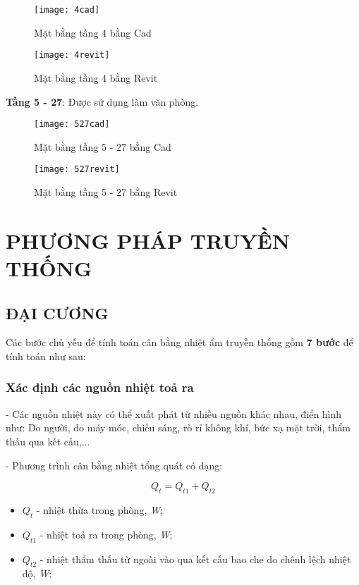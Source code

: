 \begin{figure}[H]
  \centering
  \texttt{[image: 4cad]}
  \caption{Mặt bằng tầng 4 bằng Cad}
\end{figure} 

\begin{figure}[H]
  \centering
  \texttt{[image: 4revit]}
  \caption{Mặt bằng tầng 4 bằng Revit}
\end{figure} 

\newpage
\textbf{Tầng 5 - 27}: Được sử dụng làm văn phòng.

\begin{figure}[H]
  \centering
  \texttt{[image: 527cad]}
  \caption{Mặt bằng tầng 5 - 27 bằng Cad}
\end{figure} 

\begin{figure}[H]
  \centering
  \texttt{[image: 527revit]}
  \caption{Mặt bằng tầng 5 - 27 bằng Revit}
\end{figure} 

\section{PHƯƠNG PHÁP TRUYỀN THỐNG}
\subsection{ĐẠI CƯƠNG}
Các bước chủ yếu để tính toán cân bằng nhiệt ẩm truyền thống gồm \textbf{7 bước} để tính toán như sau:
\subsubsection{Xác định các nguồn nhiệt toả ra}
- Các nguồn nhiệt này có thể xuất phát từ nhiều nguồn khác nhau, điển hình như: Do người, do máy móc, chiếu sáng, rò rỉ không khí, bức xạ mặt trời, thẩm thấu qua kết cấu,...

- Phương trình cân bằng nhiệt tổng quát có dạng:

\begin{equation}
	Q_{t} = Q_{t1} + Q_{t2}
\end{equation}

\begin{itemize}[leftmargin = 3cm, label = $\star$]
	\item $Q_{t}$ - nhiệt thừa trong phòng, \textit{W};
	\item $Q_{t1}$ - nhiệt toả ra trong phòng, \textit{W};
	\item $Q_{t2}$ - nhiệt thẩm thấu từ ngoài vào qua kết cấu bao che do chênh lệch nhiệt độ, \textit{W};
\end{itemize}


